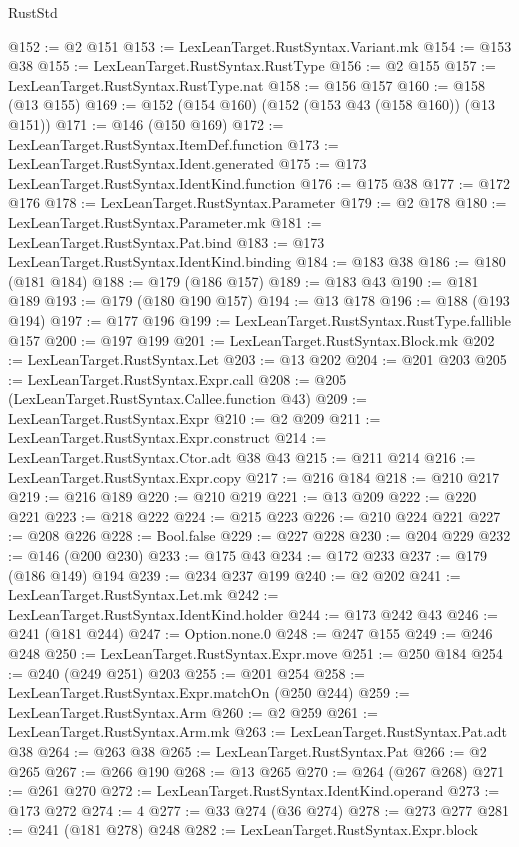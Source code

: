 \begin{lexlean}{RustStd}
\begin{coremodule}
@152 := @2 @151
@153 := LexLeanTarget.RustSyntax.Variant.mk
@154 := @153 @38
@155 := LexLeanTarget.RustSyntax.RustType
@156 := @2 @155
@157 := LexLeanTarget.RustSyntax.RustType.nat
@158 := @156 @157
@160 := @158 (@13 @155)
@169 := @152 (@154 @160) (@152 (@153 @43 (@158 @160)) (@13 @151))
@171 := @146 (@150 @169)
@172 := LexLeanTarget.RustSyntax.ItemDef.function
@173 := LexLeanTarget.RustSyntax.Ident.generated
@175 := @173 LexLeanTarget.RustSyntax.IdentKind.function
@176 := @175 @38
@177 := @172 @176
@178 := LexLeanTarget.RustSyntax.Parameter
@179 := @2 @178
@180 := LexLeanTarget.RustSyntax.Parameter.mk
@181 := LexLeanTarget.RustSyntax.Pat.bind
@183 := @173 LexLeanTarget.RustSyntax.IdentKind.binding
@184 := @183 @38
@186 := @180 (@181 @184)
@188 := @179 (@186 @157)
@189 := @183 @43
@190 := @181 @189
@193 := @179 (@180 @190 @157)
@194 := @13 @178
@196 := @188 (@193 @194)
@197 := @177 @196
@199 := LexLeanTarget.RustSyntax.RustType.fallible @157
@200 := @197 @199
@201 := LexLeanTarget.RustSyntax.Block.mk
@202 := LexLeanTarget.RustSyntax.Let
@203 := @13 @202
@204 := @201 @203
@205 := LexLeanTarget.RustSyntax.Expr.call
@208 := @205 (LexLeanTarget.RustSyntax.Callee.function @43)
@209 := LexLeanTarget.RustSyntax.Expr
@210 := @2 @209
@211 := LexLeanTarget.RustSyntax.Expr.construct
@214 := LexLeanTarget.RustSyntax.Ctor.adt @38 @43
@215 := @211 @214
@216 := LexLeanTarget.RustSyntax.Expr.copy
@217 := @216 @184
@218 := @210 @217
@219 := @216 @189
@220 := @210 @219
@221 := @13 @209
@222 := @220 @221
@223 := @218 @222
@224 := @215 @223
@226 := @210 @224 @221
@227 := @208 @226
@228 := Bool.false
@229 := @227 @228
@230 := @204 @229
@232 := @146 (@200 @230)
@233 := @175 @43
@234 := @172 @233
@237 := @179 (@186 @149) @194
@239 := @234 @237 @199
@240 := @2 @202
@241 := LexLeanTarget.RustSyntax.Let.mk
@242 := LexLeanTarget.RustSyntax.IdentKind.holder
@244 := @173 @242 @43
@246 := @241 (@181 @244)
@247 := Option.none.{0}
@248 := @247 @155
@249 := @246 @248
@250 := LexLeanTarget.RustSyntax.Expr.move
@251 := @250 @184
@254 := @240 (@249 @251) @203
@255 := @201 @254
@258 := LexLeanTarget.RustSyntax.Expr.matchOn (@250 @244)
@259 := LexLeanTarget.RustSyntax.Arm
@260 := @2 @259
@261 := LexLeanTarget.RustSyntax.Arm.mk
@263 := LexLeanTarget.RustSyntax.Pat.adt @38
@264 := @263 @38
@265 := LexLeanTarget.RustSyntax.Pat
@266 := @2 @265
@267 := @266 @190
@268 := @13 @265
@270 := @264 (@267 @268)
@271 := @261 @270
@272 := LexLeanTarget.RustSyntax.IdentKind.operand
@273 := @173 @272
@274 := 4
@277 := @33 @274 (@36 @274)
@278 := @273 @277
@281 := @241 (@181 @278) @248
@282 := LexLeanTarget.RustSyntax.Expr.block

\end{coremodule}
\end{lexlean}
